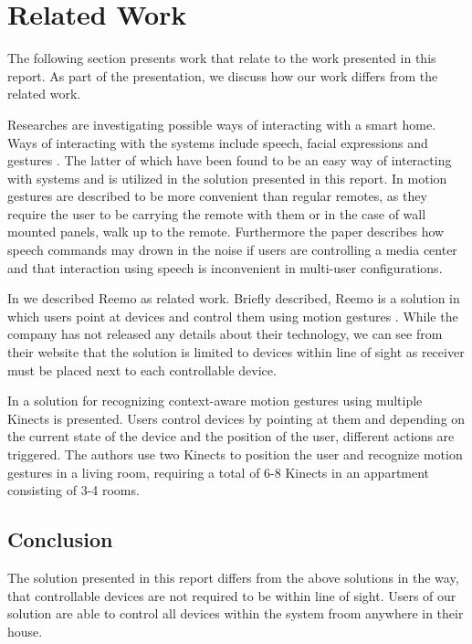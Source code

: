 \section{Related Work}
\label{sec:related-work}

The following section presents work that relate to the work presented in this report. As part of the presentation, we discuss how our work differs from the related work.

Researches are investigating possible ways of interacting with a smart home. Ways of interacting with the systems include speech, facial expressions and gestures \cite[pp. 9-10]{cook2007smart}. The latter of which have been found to be an easy way of interacting with systems \cite[p. 6]{rahman2011motion} and is utilized in the solution presented in this report. In \cite[pp. 2-3]{starner2000gesture} motion gestures are described to be more convenient than regular remotes, as they require the user to be carrying the remote with them or in the case of wall mounted panels, walk up to the remote. Furthermore the paper describes how speech commands may drown in the noise if users are controlling a media center and that interaction using speech is inconvenient in multi-user configurations.

In \cite[pp. 9-11]{prespecialisation} we described Reemo as related work. Briefly described, Reemo is a solution in which users point at devices and control them using motion gestures \cite{reemo:about}. While the company has not released any details about their technology, we can see from their website that the solution is limited to devices within line of sight as receiver must be placed next to each controllable device.

In \cite{caon2011context} a solution for recognizing context-aware motion gestures using multiple Kinects is presented. Users control devices by pointing at them and depending on the current state of the device and the position of the user, different actions are triggered.
The authors use two Kinects to position the user and recognize motion gestures in a living room, requiring a total of 6-8 Kinects in an appartment consisting of 3-4 rooms.

\subsection{Conclusion}

The solution presented in this report differs from the above solutions in the way, that controllable devices are not required to be within line of sight. Users of our solution are able to control all devices within the system froom anywhere in their house.

